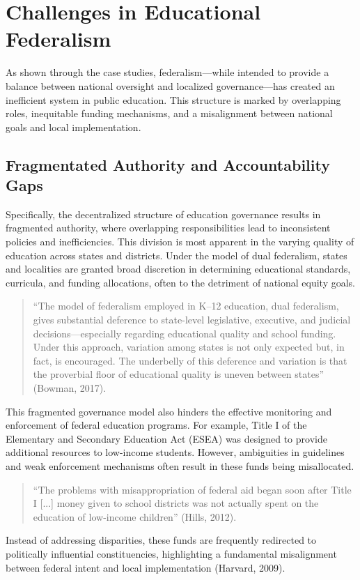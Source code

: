 \documentclass[11pt]{extarticle}
\begin{document}
\section{Challenges in Educational Federalism}
As shown through the case studies, federalism---while intended to provide a balance between national oversight and localized governance---has created an inefficient system in public education. This structure is marked by overlapping roles, inequitable funding mechanisms, and a misalignment between national goals and local implementation. 
\subsection{Fragmentated Authority and Accountability Gaps}
Specifically, the decentralized structure of education governance results in fragmented authority, where overlapping responsibilities lead to inconsistent policies and inefficiencies. This division is most apparent in the varying quality of education across states and districts. Under the model of dual federalism, states and localities are granted broad discretion in determining educational standards, curricula, and funding allocations, often to the detriment of national equity goals.
\begin{quote}
``The model of federalism employed in K–12 education, dual federalism, gives substantial deference to state-level legislative, executive, and judicial decisions—especially regarding educational quality and school funding. Under this approach, variation among states is not only expected but, in fact, is encouraged. The underbelly of this deference and variation is that the proverbial floor of educational quality is uneven between states” (Bowman, 2017).
\end{quote}
This fragmented governance model also hinders the effective monitoring and enforcement of federal education programs. For example, Title I of the Elementary and Secondary Education Act (ESEA) was designed to provide additional resources to low-income students. However, ambiguities in guidelines and weak enforcement mechanisms often result in these funds being misallocated.
\begin{quote}
``The problems with misappropriation of federal aid began soon after Title I [...] money given to school districts was not actually spent on the education of low-income children” (Hills, 2012).
\end{quote}
Instead of addressing disparities, these funds are frequently redirected to politically influential constituencies, highlighting a fundamental misalignment between federal intent and local implementation (Harvard, 2009).
\end{document}
